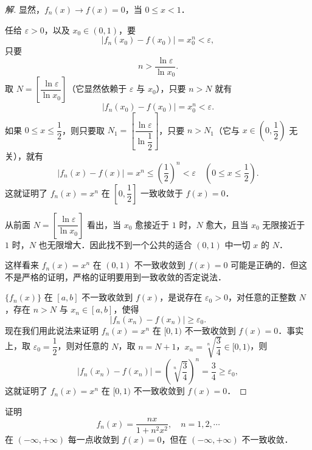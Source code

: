 \begin{proof}[解]
显然，$f_{n}(x)\to f(x)=0$，当 $0\leqslant x<1$．

任给 $\varepsilon>0$，以及 $x_{0}\in(0,1)$，要
\[
\left|f_{n}(x_{0})-f(x_{0})\right|=x_{0}^{n}<\varepsilon,
\]
只要
\[
n>\frac{\ln\varepsilon}{\ln x_{0}}.
\]
取 $N=\left[\dfrac{\ln\varepsilon}{\ln x_{0}}\right]$（它显然依赖于 $\varepsilon$ 与 $x_{0}$），只要 $n>N$ 就有
\[
\left|f_{n}(x_{0})-f(x_{0})\right|=x_{0}^{n}<\varepsilon.
\]
如果 $0\leqslant x\leqslant\dfrac{1}{2}$，则只要取 $N_{1}=\left[\dfrac{\ln\varepsilon}{\ln\dfrac{1}{2}}\right]$，只要 $n>N_{1}$（它与 $x\in\left(0,\dfrac{1}{2}\right)$ 无关），就有
\[
\left|f_{n}(x)-f(x)\right|=x^{n}\leqslant\left(\frac{1}{2}\right)^{n}<\varepsilon\quad\left(0\leqslant x\leqslant\frac{1}{2}\right).
\]
这就证明了 $f_{n}(x)=x^{n}$ 在 $\left[0,\dfrac{1}{2}\right]$ 一致收敛于 $f(x)=0$．

从前面 $N=\left[\dfrac{\ln\varepsilon}{\ln x_{0}}\right]$ 看出，当 $x_{0}$ 愈接近于 $1$ 时，$N$ 愈大，且当 $x_{0}$ 无限接近于 $1$ 时，$N$ 也无限增大．因此找不到一个公共的适合 $(0,1)$ 中一切 $x$ 的 $N$．

这样看来 $f_{n}(x)=x^{n}$ 在 $(0,1)$ 不一致收敛到 $f(x)=0$ 可能是正确的．但这不是严格的证明，严格的证明要用到一致收敛的否定说法．

$\{f_{n}(x)\}$ 在 $[a,b]$ 不一致收敛到 $f(x)$，是说存在 $\varepsilon_{0}>0$，对任意的正整数 $N$，存在 $n>N$ 与 $x_{n}\in[a,b]$，使得
\[
\left|f_{n}(x_{n})-f(x_{n})\right|\geqslant\varepsilon_{0}.
\]
现在我们用此说法来证明 $f_{n}(x)=x^{n}$ 在 $[0,1)$ 不一致收敛到 $f(x)=0$．事实上，取 $\varepsilon_{0}=\dfrac{1}{2}$，则对任意的 $N$，取 $n=N+1$，$x_{n}=\sqrt[n]{\dfrac{3}{4}}\in[0,1)$，则
\[
\left|f_{n}(x_{n})-f(x_{n})\right|=\left(\sqrt[n]{\frac{3}{4}}\right)^{n}=\frac{3}{4}\geqslant\varepsilon_{0},
\]
这就证明了 $f_{n}(x)=x^{n}$ 在 $[0,1)$ 不一致收敛到 $f(x)=0$．
\end{proof}

\begin{example}\label{ex:12-1-7}
证明
\[
f_{n}(x)=\frac{nx}{1+n^{2}x^{2}},\quad n=1,2,\cdots
\]
在 $(-\infty,+\infty)$ 每一点收敛到 $f(x)=0$，但在 $(-\infty,+\infty)$ 不一致收敛．
\end{example}

